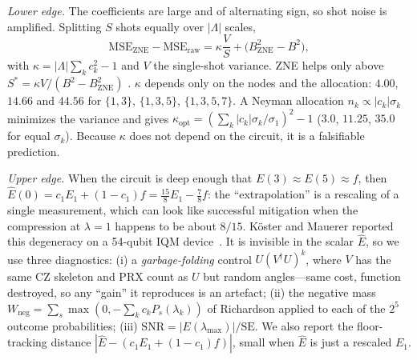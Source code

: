 \documentclass[conference]{IEEEtran}
\begin{document}
\emph{Lower edge.} The coefficients are large and of alternating sign, so shot noise is
amplified. Splitting $S$ shots equally over $|\Lambda|$ scales,
\begin{equation}
  \mathrm{MSE}_{\text{ZNE}}-\mathrm{MSE}_{\text{raw}}=\kappa\frac{V}{S}+\bigl(B_{\text{ZNE}}^2-B^2\bigr),
  \label{eq:kappa}
\end{equation}
with $\kappa=|\Lambda|\sum_kc_k^2-1$ and $V$ the single-shot variance. ZNE helps only above $S^\ast=\kappa V/(B^2-B_{\text{ZNE}}^2)$
\cite{krebsbach2022,scavino2026}. $\kappa$ depends only on the nodes and the allocation:
$4.00$, $14.66$ and $44.56$ for $\{1,3\}$, $\{1,3,5\}$, $\{1,3,5,7\}$. A Neyman allocation
$n_k\propto|c_k|\sigma_k$ minimizes the variance and gives
$\kappa_{\text{opt}}=(\sum_k|c_k|\sigma_k/\sigma_1)^2-1$ ($3.0$, $11.25$, $35.0$ for equal
$\sigma_k$). Because $\kappa$ does not depend on the circuit, it is a falsifiable prediction.

\emph{Upper edge.} When the circuit is deep enough that $E(3)\approx E(5)\approx f$, then
$\hat E(0)=c_1E_1+(1-c_1)f=\tfrac{15}{8}E_1-\tfrac78f$: the ``extrapolation'' is a rescaling of a
single measurement, which can look like successful mitigation when the compression at
$\lambda=1$ happens to be about $8/15$. K\"oster and Mauerer reported this degeneracy on a
54-qubit IQM device~\cite{koster2026}. It is invisible in the scalar $\hat E$, so we use three
diagnostics: (i) a \emph{garbage-folding} control $U(V^\dagger U)^k$, where $V$ has the same CZ
skeleton and PRX count as $U$ but random angles---same cost, function destroyed, so any
``gain'' it reproduces is an artefact; (ii) the negative mass $W_{\text{neg}}=\sum_s\max(0,
-\sum_kc_kP_s(\lambda_k))$ of Richardson applied to each of the $2^5$ outcome probabilities;
(iii) $\mathrm{SNR}=|E(\lambda_{\max})|/\mathrm{SE}$. We also report the floor-tracking distance
$|\hat E-(c_1E_1+(1-c_1)f)|$, small when $\hat E$ is just a rescaled $E_1$.
\end{document}
